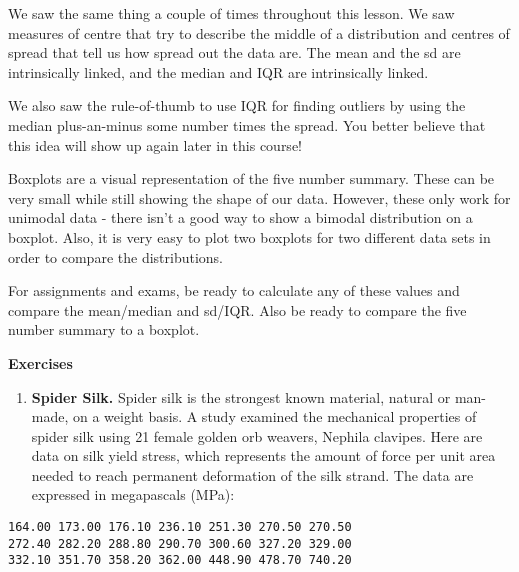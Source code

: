 \documentclass[
  letterpaper,
  DIV=11,
  numbers=noendperiod]{scrreprt}
\providecommand{\tightlist}{%
  \setlength{\itemsep}{0pt}\setlength{\parskip}{0pt}}\usepackage{longtable,booktabs,array}
\begin{document}
We saw the same thing a couple of times throughout this lesson. We saw
measures of centre that try to describe the middle of a distribution and
centres of spread that tell us how spread out the data are. The mean and
the sd are intrinsically linked, and the median and IQR are
intrinsically linked.

We also saw the rule-of-thumb to use IQR for finding outliers by using
the median plus-an-minus some number times the spread. You better
believe that this idea will show up again later in this course!

Boxplots are a visual representation of the five number summary. These
can be very small while still showing the shape of our data. However,
these only work for unimodal data - there isn't a good way to show a
bimodal distribution on a boxplot. Also, it is very easy to plot two
boxplots for two different data sets in order to compare the
distributions.

For assignments and exams, be ready to calculate any of these values and
compare the mean/median and sd/IQR. Also be ready to compare the five
number summary to a boxplot.

\textbf{Exercises}

\begin{enumerate}
\def\labelenumi{\arabic{enumi}.}
\tightlist
\item
  \textbf{Spider Silk.} Spider silk is the strongest known material,
  natural or man-made, on a weight basis. A study examined the
  mechanical properties of spider silk using 21 female golden orb
  weavers, Nephila clavipes. Here are data on silk yield stress, which
  represents the amount of force per unit area needed to reach permanent
  deformation of the silk strand. The data are expressed in megapascals
  (MPa):
\end{enumerate}

\begin{verbatim}
164.00 173.00 176.10 236.10 251.30 270.50 270.50
272.40 282.20 288.80 290.70 300.60 327.20 329.00
332.10 351.70 358.20 362.00 448.90 478.70 740.20
\end{verbatim}
\end{document}
